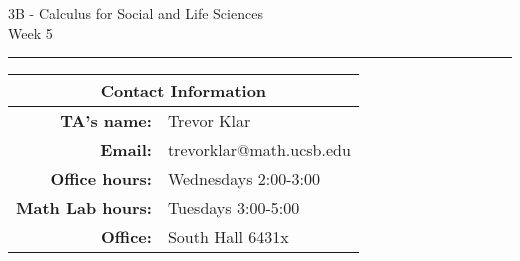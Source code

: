 \documentclass[12pt,letterpaper]{article}
\begin{document}
\thispagestyle{fancy}
\begin{center}
3B - Calculus for Social and Life Sciences\\
Week 5 %
\end{center}

\hrule

\begin{center}
\begin{tabular}{|rl|}
\hline
\multicolumn{2}{|c|}{Contact Information} \\
\hline
\bf{TA's name:} & Trevor Klar \\
\bf{Email:} & trevorklar@math.ucsb.edu \\
\bf{Office hours:} & Wednesdays 2:00-3:00 \\
\bf{Math Lab hours:} & Tuesdays 3:00-5:00 \\
\bf{Office:} & South Hall 6431x \\
\hline
\end{tabular}
\end{center}


\bigskip
\end{document}
